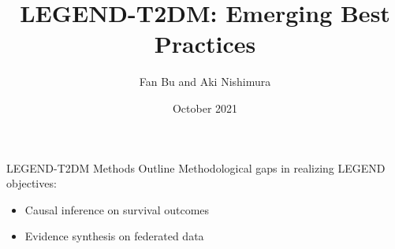 \documentclass[aspectratio=169,xcolor=dvipsnames]{beamer}					%
\title{\hspace{0.2in}LEGEND-T2DM: Emerging Best Practices}	%
\author{Fan Bu and Aki Nishimura}								%
\institute{on behalf of the LEGEND initiative}					%
\date{October 2021}
\begin{document}
{
%
\begin{frame}[plain]
  \titlepage
\end{frame}
}

{
\begin{frame}{LEGEND-T2DM Methods Outline}
Methodological gaps in realizing LEGEND objectives:
\begin{itemize}
    \item Causal inference on survival outcomes
    \item Evidence synthesis on federated data
\end{itemize}
\end{frame}
}
\end{document}
